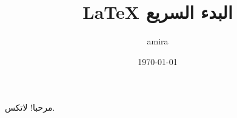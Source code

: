 \documentclass[11pt, a4paper]{article}
\title{LaTeX البدء السريع}
\author{amira}
\date{\today}
\begin{document}
\maketitle
 مرحبا! لاتكس.
\end{document}

